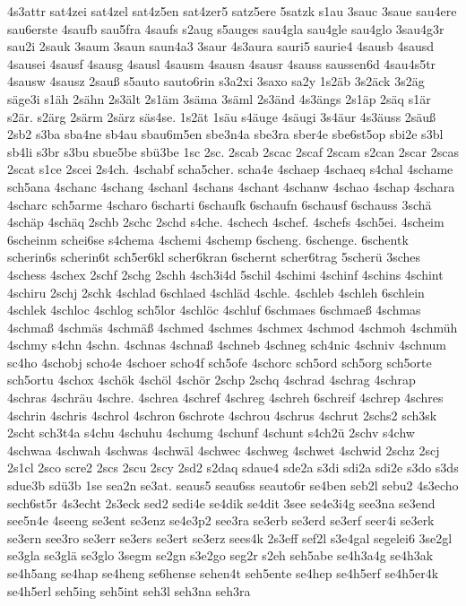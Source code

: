 {4s3attr
sat4zei
sat4zel
sat4z5en
sat4zer5
satz5ere
5satzk
s1au
3sauc
3saue
sau4ere
sau6erste
4saufb
sau5fra
4saufs
s2aug
s5auges
sau4gla
sau4gle
sau4glo
3sau4g3r
sau2i
2sauk
3saum
3saun
saun4a3
3saur
4s3aura
sauri5
saurie4
4sausb
4sausd
4sausei
4sausf
4sausg
4sausl
4sausm
4sausn
4sausr
4sauss
saussen6d
4sau4s5tr
4sausw
4sausz
2sauß
s5auto
sauto6rin
s3a2xi
3saxo
sa2y
1s2äb
3s2äck
3s2äg
säge3i
s1äh
2sähn
2s3ält
2s1äm
3säma
3säml
2s3änd
4s3ängs
2s1äp
2säq
s1är
s2är.
s2ärg
2särm
2särz
säs4se.
1s2ät
1säu
s4äuge
4säugi
3s4äur
4s3äuss
2säuß
2sb2
s3ba
sba4ne
sb4au
sbau6m5en
sbe3n4a
sbe3ra
sber4e
sbe6st5op
sbi2e
s3bl
sb4li
s3br
s3bu
sbue5be
sbü3be
1sc
2sc.
2scab
2scac
2scaf
2scam
s2can
2scar
2scas
2scat
s1ce
2scei
2s4ch.
4schabf
scha5cher.
scha4e
4schaep
4schaeq
s4chal
4schame
sch5ana
4schanc
4schang
4schanl
4schans
4schant
4schanw
4schao
4schap
4schara
4scharc
sch5arme
4scharo
6scharti
6schaufk
6schaufn
6schausf
6schauss
3schä
4schäp
4schäq
2schb
2schc
2schd
s4che.
4schech
4schef.
4schefs
4sch5ei.
4scheim
6scheinm
schei6se
s4chema
4schemi
4schemp
6scheng.
6schenge.
6schentk
scherin6s
scherin6t
sch5er6kl
scher6kran
6schernt
scher6trag
5scherü
3sches
4schess
4schex
2schf
2schg
2schh
4sch3i4d
5schil
4schimi
4schinf
4schins
4schint
4schiru
2schj
2schk
4schlad
6schlaed
4schläd
4schle.
4schleb
4schleh
6schlein
4schlek
4schloc
4schlog
sch5lor
4schlöc
4schluf
6schmaes
6schmaeß
4schmas
4schmaß
4schmäs
4schmäß
4schmed
4schmes
4schmex
4schmod
4schmoh
4schmüh
4schmy
s4chn
4schn.
4schnas
4schnaß
4schneb
4schneg
sch4nic
4schniv
4schnum
sc4ho
4schobj
scho4e
4schoer
scho4f
sch5ofe
4schorc
sch5ord
sch5org
sch5orte
sch5ortu
4schox
4schök
4schöl
4schör
2schp
2schq
4schrad
4schrag
4schrap
4schras
4schräu
4schre.
4schrea
4schref
4schreg
4schreh
6schreif
4schrep
4schres
4schrin
4schris
4schrol
4schron
6schrote
4schrou
4schrus
4schrut
2schs2
sch3sk
2scht
sch3t4a
s4chu
4schuhu
4schumg
4schunf
4schunt
s4ch2ü
2schv
s4chw
4schwaa
4schwah
4schwas
4schwäl
4schwec
4schweg
4schwet
4schwid
2schz
2scj
2s1cl
2sco
scre2
2scs
2scu
2scy
2sd2
s2daq
sdaue4
sde2a
s3di
sdi2a
sdi2e
s3do
s3ds
sdue3b
sdü3b
1se
sea2n
se3at.
seaus5
seau6ss
seauto6r
se4ben
seb2l
sebu2
4s3echo
sech6st5r
4s3echt
2s3eck
sed2
sedi4e
se4dik
se4dit
3see
se4e3i4g
see3na
se3end
see5n4e
4seeng
se3ent
se3enz
se4e3p2
see3ra
se3erb
se3erd
se3erf
seer4i
se3erk
se3ern
see3ro
se3err
se3ers
se3ert
se3erz
sees4k
2s3eff
sef2l
s3e4gal
segelei6
3se2gl
se3gla
se3glä
se3glo
3segm
se2gn
s3e2go
seg2r
s2eh
seh5abe
se4h3a4g
se4h3ak
se4h5ang
se4hap
se4heng
se6hense
sehen4t
seh5ente
se4hep
se4h5erf
se4h5er4k
se4h5erl
seh5ing
seh5int
seh3l
seh3na
seh3ra
}

